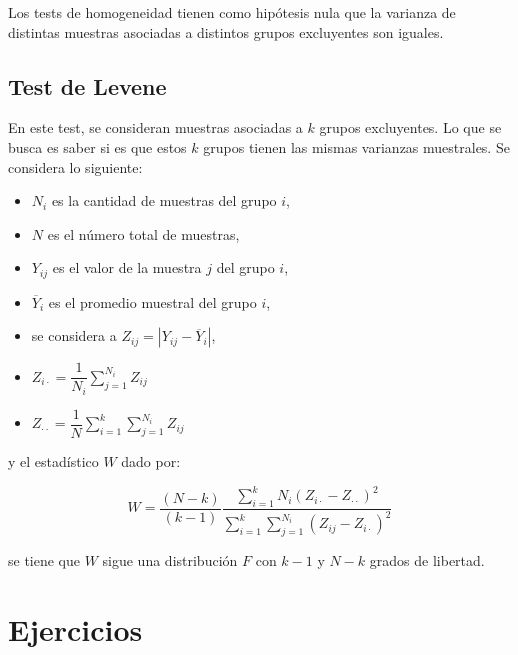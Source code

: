 Los tests de homogeneidad tienen como hipótesis nula que la varianza de distintas muestras asociadas a distintos grupos excluyentes son iguales. 

\subsection{Test de Levene}

En este test, se consideran muestras asociadas a $k$ grupos excluyentes. Lo que se busca es saber si es que estos $k$ grupos tienen las mismas varianzas muestrales. Se considera lo siguiente:

\begin{itemize}
    \item $N_i$ es la cantidad de muestras del grupo $i$,
    \item $N$ es el número total de muestras,
    \item $Y_{ij}$ es el valor de la muestra $j$ del grupo $i$,
    \item $\overline{Y}_i$ es el promedio muestral del grupo $i$,
    \item se considera a  $Z_{ij}=|Y_{ij}-\overline{Y}_i|$,
    \item $Z_{i\cdot}=\dfrac{1}{N_i}\sum\limits_{j=1}^{N_i}Z_{ij}$
    \item $Z_{\cdot\cdot}=\dfrac{1}{N}\sum\limits_{i=1}^{k}\sum\limits_{j=1}^{N_i}Z_{ij}$
\end{itemize}

y el estadístico $W$ dado por:

\[W=\dfrac{(N-k)}{(k-1)}\dfrac{\sum\limits_{i=1}^{k}N_i(Z_{i\cdot}-Z_{\cdot\cdot})^2}{\sum\limits_{i=1}^{k}\sum\limits_{j=1}^{N_i}(Z_{ij}-Z_{i\cdot})^2}\]

se tiene que $W$ sigue una distribución $F$ con $k-1$ y $N-k$ grados de libertad. 

 
 \section{Ejercicios}
 
